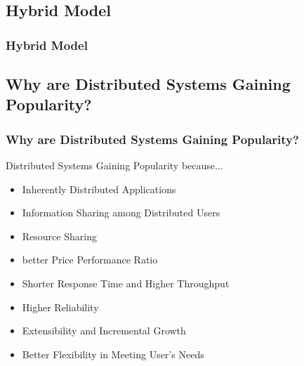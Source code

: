 \documentclass{beamer}
\begin{document}
\subsection{Hybrid Model}
\begin{frame}
    \frametitle{Hybrid Model}
\end{frame}



\subsection{Why are Distributed Systems Gaining Popularity?}
\begin{frame}
    \frametitle{Why are Distributed Systems Gaining Popularity?}
    Distributed Systems Gaining Popularity because...
    \begin{itemize}
      \item Inherently Distributed Applications
      \item Information Sharing among Distributed Users
      \item Resource Sharing
      \item better Price Performance Ratio
      \item Shorter Response Time and Higher Throughput
      \item Higher Reliability
      \item Extensibility and Incremental Growth
      \item Better Flexibility in Meeting User's Needs
    \end{itemize}
    \vspace{2cm}
\end{frame}
\end{document}
